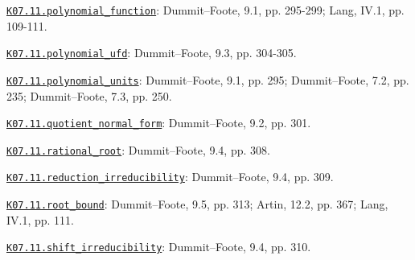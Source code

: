 \par\smallskip\noindent\hypertarget{src:K07.11.polynomial_function}{}\label{src:K07.11.polynomial_function}\hyperref[K07.11.polynomial_function]{\texttt{K07.11.polynomial\_function}}: Dummit--Foote, 9.1, pp. 295-299; Lang, IV.1, pp. 109-111.
\par\smallskip\noindent\hypertarget{src:K07.11.polynomial_ufd}{}\label{src:K07.11.polynomial_ufd}\hyperref[K07.11.polynomial_ufd]{\texttt{K07.11.polynomial\_ufd}}: Dummit--Foote, 9.3, pp. 304-305.
\par\smallskip\noindent\hypertarget{src:K07.11.polynomial_units}{}\label{src:K07.11.polynomial_units}\hyperref[K07.11.polynomial_units]{\texttt{K07.11.polynomial\_units}}: Dummit--Foote, 9.1, pp. 295; Dummit--Foote, 7.2, pp. 235; Dummit--Foote, 7.3, pp. 250.
\par\smallskip\noindent\hypertarget{src:K07.11.quotient_normal_form}{}\label{src:K07.11.quotient_normal_form}\hyperref[K07.11.quotient_normal_form]{\texttt{K07.11.quotient\_normal\_form}}: Dummit--Foote, 9.2, pp. 301.
\par\smallskip\noindent\hypertarget{src:K07.11.rational_root}{}\label{src:K07.11.rational_root}\hyperref[K07.11.rational_root]{\texttt{K07.11.rational\_root}}: Dummit--Foote, 9.4, pp. 308.
\par\smallskip\noindent\hypertarget{src:K07.11.reduction_irreducibility}{}\label{src:K07.11.reduction_irreducibility}\hyperref[K07.11.reduction_irreducibility]{\texttt{K07.11.reduction\_irreducibility}}: Dummit--Foote, 9.4, pp. 309.
\par\smallskip\noindent\hypertarget{src:K07.11.root_bound}{}\label{src:K07.11.root_bound}\hyperref[K07.11.root_bound]{\texttt{K07.11.root\_bound}}: Dummit--Foote, 9.5, pp. 313; Artin, 12.2, pp. 367; Lang, IV.1, pp. 111.
\par\smallskip\noindent\hypertarget{src:K07.11.shift_irreducibility}{}\label{src:K07.11.shift_irreducibility}\hyperref[K07.11.shift_irreducibility]{\texttt{K07.11.shift\_irreducibility}}: Dummit--Foote, 9.4, pp. 310.
